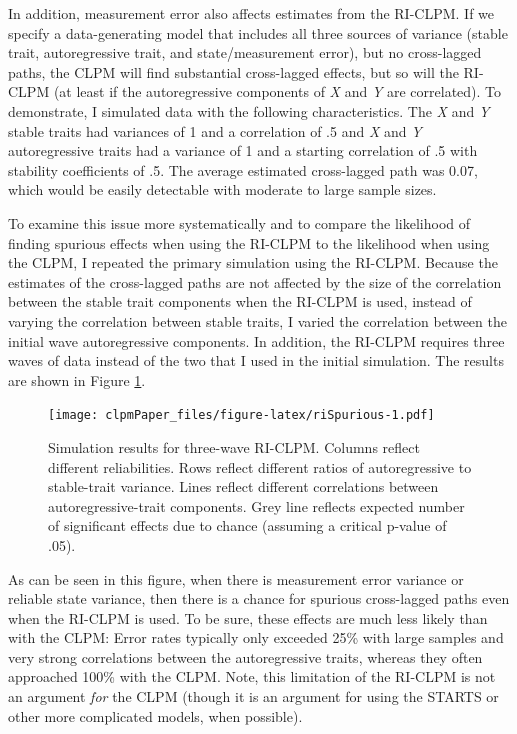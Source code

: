 \documentclass[
  english,
  man,floatsintext]{apa6}
\begin{document}
In addition, measurement error also affects estimates from the RI-CLPM. If we specify a data-generating model that includes all three sources of variance (stable trait, autoregressive trait, and state/measurement error), but no cross-lagged paths, the CLPM will find substantial cross-lagged effects, but so will the RI-CLPM (at least if the autoregressive components of \emph{X} and \emph{Y} are correlated). To demonstrate, I simulated data with the following characteristics. The \emph{X} and \emph{Y} stable traits had variances of 1 and a correlation of .5 and \emph{X} and \emph{Y} autoregressive traits had a variance of 1 and a starting correlation of .5 with stability coefficients of .5. The average estimated cross-lagged path was 0.07, which would be easily detectable with moderate to large sample sizes.

To examine this issue more systematically and to compare the likelihood of finding spurious effects when using the RI-CLPM to the likelihood when using the CLPM, I repeated the primary simulation using the RI-CLPM. Because the estimates of the cross-lagged paths are not affected by the size of the correlation between the stable trait components when the RI-CLPM is used, instead of varying the correlation between stable traits, I varied the correlation between the initial wave autoregressive components. In addition, the RI-CLPM requires three waves of data instead of the two that I used in the initial simulation. The results are shown in Figure \ref{fig:riSpurious}.

\begin{figure}
\centering
\texttt{[image: clpmPaper\_files/figure-latex/riSpurious-1.pdf]}
\caption{\label{fig:riSpurious}Simulation results for three-wave RI-CLPM. Columns reflect different reliabilities. Rows reflect different ratios of autoregressive to stable-trait variance. Lines reflect different correlations between autoregressive-trait components. Grey line reflects expected number of significant effects due to chance (assuming a critical p-value of .05).}
\end{figure}

As can be seen in this figure, when there is measurement error variance or reliable state variance, then there is a chance for spurious cross-lagged paths even when the RI-CLPM is used. To be sure, these effects are much less likely than with the CLPM: Error rates typically only exceeded 25\% with large samples and very strong correlations between the autoregressive traits, whereas they often approached 100\% with the CLPM. Note, this limitation of the RI-CLPM is not an argument \emph{for} the CLPM (though it is an argument for using the STARTS or other more complicated models, when possible).
\end{document}
